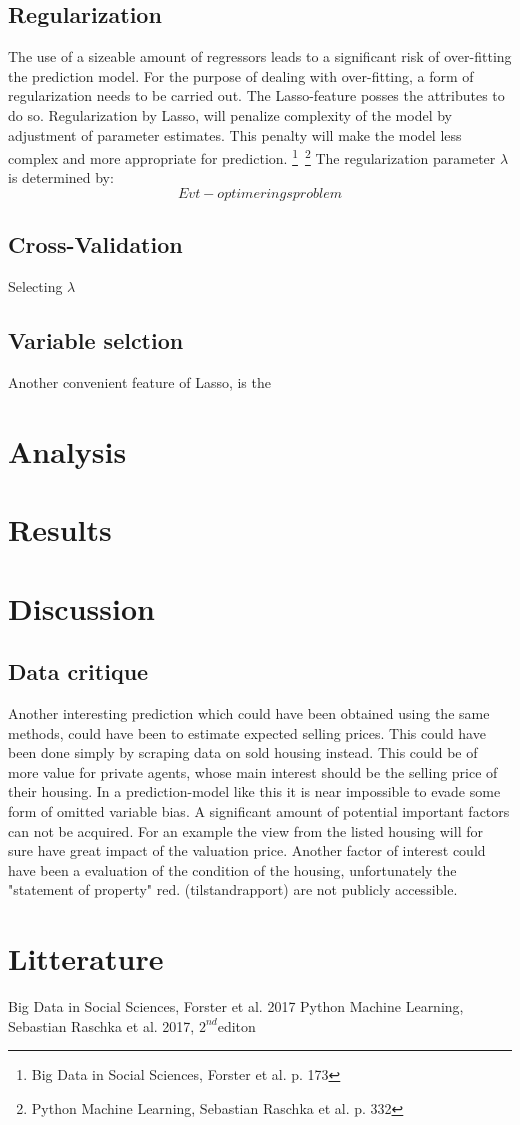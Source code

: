 \documentclass[12pt,a4paper]{article}
\begin{document}
\subsection{Regularization}
The use of a sizeable amount of regressors leads to a significant risk of over-fitting the prediction model. 
For the purpose of dealing with over-fitting, a form of regularization needs to be carried out. The Lasso-feature posses the attributes to do so. Regularization by Lasso, will penalize complexity of the model by adjustment of parameter estimates. This penalty will make the model less complex and more appropriate for prediction. \footnote{Big Data in Social Sciences, Forster et al. p. 173}\, \footnote{Python Machine Learning, Sebastian Raschka et al. p. 332}
\newline The regularization parameter $\lambda$ is determined by: $$Evt-optimeringsproblem$$

\subsection{Cross-Validation}
Selecting $\lambda$ 


\subsection{Variable selction}
Another convenient feature of Lasso, is the  


\section{Analysis}

\section{Results}

\section{Discussion}
\subsection{Data critique}
Another interesting prediction which could have been obtained using the same methods, could have been to estimate expected selling prices. This could have been done simply by scraping data on sold housing instead. This could be of more value for private agents, whose main interest should be the selling price of their housing. 
\newline 
In a prediction-model like this it is near impossible to evade some form of omitted variable bias. A significant amount of potential important factors can not be acquired. For an example the view from the listed housing will for sure have great impact of the valuation price. Another factor of interest could have been a evaluation of the condition of the housing, unfortunately the "statement of property" red. (tilstandrapport) are not publicly accessible.

\newpage
\section{Litterature}
Big Data in Social Sciences, Forster et al. 2017
\newline Python Machine Learning, Sebastian Raschka et al. 2017, $2^{nd}$editon
\end{document}
